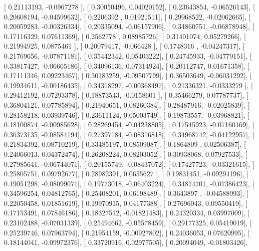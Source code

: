 \documentclass{article}
\begin{document}
       [ 0.21113193, -0.0967278 ],
       [ 0.30050496,  0.04020152],
       [ 0.23643854, -0.06526143],
       [ 0.20608194, -0.04599632],
       [ 0.2206392 ,  0.01921511],
       [ 0.29968522, -0.02062665],
       [ 0.20059283, -0.00326334],
       [ 0.20335094, -0.06157906],
       [ 0.34860751, -0.06878948],
       [ 0.17116329,  0.07611369],
       [ 0.2562778 ,  0.08985726],
       [ 0.31401074,  0.05279266],
       [ 0.21994925,  0.0875461 ],
       [ 0.20079417, -0.066428  ],
       [ 0.1748316 , -0.04247317],
       [ 0.21769656, -0.07871181],
       [ 0.35442342,  0.05403222],
       [ 0.24745933, -0.04779151],
       [ 0.33817427, -0.06665186],
       [ 0.34096136,  0.07314924],
       [ 0.20112747,  0.01671358],
       [ 0.17111346,  0.09223467],
       [ 0.30183259, -0.09507799],
       [ 0.36503649, -0.06031292],
       [ 0.19934611, -0.00186435],
       [ 0.34318297, -0.00368497],
       [ 0.21336321, -0.0333279 ],
       [ 0.29412192,  0.07293378],
       [ 0.18873543, -0.0158601 ],
       [ 0.35466279,  0.07787737],
       [ 0.36804121,  0.07785894],
       [ 0.21940651,  0.08260384],
       [ 0.28487916, -0.02025839],
       [ 0.28158218,  0.03939746],
       [ 0.23611124,  0.05003749],
       [ 0.19873557, -0.03968821],
       [ 0.18100874, -0.00985628],
       [ 0.28269454, -0.04238805],
       [ 0.17545923, -0.07160169],
       [ 0.36373135, -0.08584194],
       [ 0.27397184, -0.08316818],
       [ 0.34968742, -0.04122957],
       [ 0.21834392,  0.08710219],
       [ 0.33485197,  0.08509087],
       [ 0.1864809 ,  0.02506387],
       [ 0.24066013,  0.04372474],
       [ 0.26208224,  0.08203052],
       [ 0.30938068,  0.07927533],
       [ 0.27985641, -0.06744071],
       [ 0.20155749, -0.08437072],
       [ 0.17427723, -0.03321615],
       [ 0.25805751,  0.09792677],
       [ 0.28982391,  0.0655627 ],
       [ 0.19831451, -0.09294196],
       [ 0.19051298, -0.08099071],
       [ 0.19773018, -0.06403224],
       [ 0.34874701, -0.07386423],
       [ 0.34596254,  0.04812765],
       [ 0.25408201,  0.06198489],
       [ 0.3643897 , -0.04588993],
       [ 0.22050458,  0.01851619],
       [ 0.19970915,  0.04177388],
       [ 0.27696043,  0.09550419],
       [ 0.17153491,  0.07846186],
       [ 0.18327512, -0.01821483],
       [ 0.24320334,  0.03997009],
       [ 0.23102488, -0.07031339],
       [ 0.25494662, -0.05578459],
       [ 0.29177325,  0.05419019],
       [ 0.25239746,  0.07963794],
       [ 0.21954159, -0.00927802],
       [ 0.24036053,  0.07620995],
       [ 0.18144041, -0.09972376],
       [ 0.33720916,  0.02977505],
       [ 0.20094049, -0.01803426],
\end{document}
